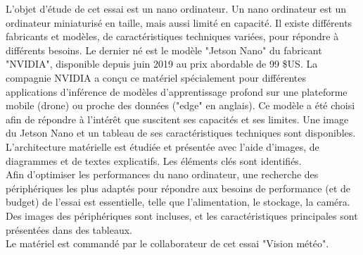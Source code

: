﻿\noindent L'objet d'étude de cet essai est un nano ordinateur. Un nano ordinateur est un ordinateur miniaturisé en taille, mais aussi limité en capacité. Il existe différents fabricants et modèles, de caractéristiques techniques variées, pour répondre à différents besoins. Le dernier né est le modèle "Jetson Nano" du fabricant "NVIDIA", disponible depuis juin 2019 au prix abordable de 99 \$US. La compagnie NVIDIA a conçu ce matériel spécialement pour différentes applications d'inférence de modèles d'apprentissage profond sur une plateforme mobile (drone) ou proche des données ("edge" en anglais). Ce modèle a été choisi afin de répondre à l'intérêt que suscitent ses capacités et ses limites. Une image du Jetson Nano et un tableau de ses caractéristiques techniques sont disponibles. 
\vspace{\baselineskip}
\\
\noindent L'architecture matérielle est étudiée et présentée avec l'aide d'images, de diagrammes et de textes explicatifs. Les éléments clés sont identifiés.
\vspace{\baselineskip}
\\
\noindent Afin d'optimiser les performances du nano ordinateur, une recherche des périphériques les plus adaptés pour répondre aux besoins de performance (et de budget) de l'essai est essentielle, telle que l'alimentation, le stockage, la caméra. Des images des périphériques sont incluses, et les caractéristiques principales sont présentées dans des tableaux.
\vspace{\baselineskip}
\\
\noindent Le matériel est commandé par le collaborateur de cet essai "Vision météo".